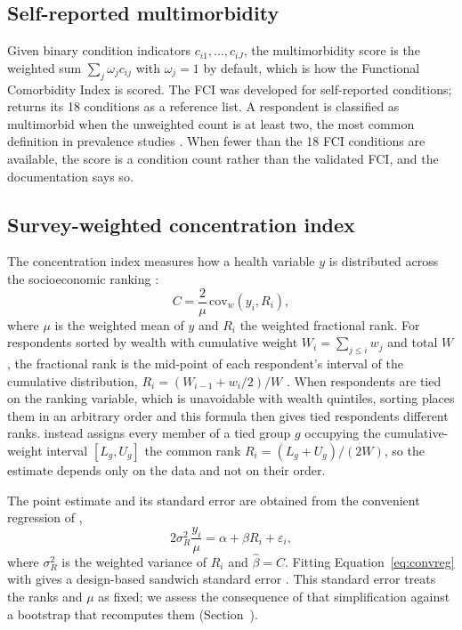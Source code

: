 \subsection{Self-reported multimorbidity}

Given binary condition indicators $c_{i1}, \dots, c_{iJ}$, the multimorbidity score is the weighted sum $\sum_j \omega_j c_{ij}$ with $\omega_j = 1$ by default, which is how the Functional Comorbidity Index \citep[FCI;][]{groll2005} is scored. The FCI was developed for self-reported conditions;  returns its 18 conditions as a reference list. A respondent is classified as multimorbid when the unweighted count is at least two, the most common definition in prevalence studies \citep{fortin2012}. When fewer than the 18 FCI conditions are available, the score is a condition count rather than the validated FCI, and the documentation says so.

\subsection{Survey-weighted concentration index}

The concentration index measures how a health variable $y$ is distributed across the socioeconomic ranking \citep{wagstaff1991, odonnell2008}:
\begin{equation}
C = \frac{2}{\mu}\, \mathrm{cov}_w(y_i, R_i),
\label{eq:ci}
\end{equation}
where $\mu$ is the weighted mean of $y$ and $R_i$ the weighted fractional rank. For respondents sorted by wealth with cumulative weight $W_i = \sum_{j \le i} w_j$ and total $W$, the fractional rank is the mid-point of each respondent's interval of the cumulative distribution, $R_i = (W_{i-1} + w_i/2)/W$ \citep{lerman1989}. When respondents are tied on the ranking variable, which is unavoidable with wealth quintiles, sorting places them in an arbitrary order and this formula then gives tied respondents different ranks.  instead assigns every member of a tied group $g$ occupying the cumulative-weight interval $[L_g, U_g]$ the common rank $R_i = (L_g + U_g)/(2W)$, so the estimate depends only on the data and not on their order.

The point estimate and its standard error are obtained from the convenient regression of \citet{kakwani1997},
\begin{equation}
2\sigma_R^2 \frac{y_i}{\mu} = \alpha + \beta R_i + \varepsilon_i ,
\label{eq:convreg}
\end{equation}
where $\sigma_R^2$ is the weighted variance of $R_i$ and $\hat\beta = C$. Fitting Equation~\ref{eq:convreg} with  gives a design-based sandwich standard error \citep{lumley2017}. This standard error treats the ranks and $\mu$ as fixed; we assess the consequence of that simplification against a bootstrap that recomputes them (Section~).

